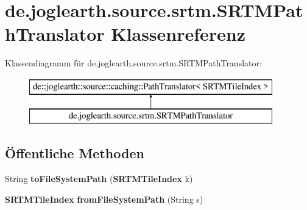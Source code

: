 \section{de.\-joglearth.\-source.\-srtm.\-S\-R\-T\-M\-Path\-Translator Klassenreferenz}
\label{classde_1_1joglearth_1_1source_1_1srtm_1_1_s_r_t_m_path_translator}
Klassendiagramm für de.\-joglearth.\-source.\-srtm.\-S\-R\-T\-M\-Path\-Translator\-:\begin{figure}[H]
\begin{center}
\leavevmode
\includegraphics[height=2.000000cm]{classde_1_1joglearth_1_1source_1_1srtm_1_1_s_r_t_m_path_translator}
\end{center}
\end{figure}
\subsection*{Öffentliche Methoden}
\begin{DoxyCompactItemize}
\item 
String {\bfseries to\-File\-System\-Path} ({\bf S\-R\-T\-M\-Tile\-Index} k)\label{classde_1_1joglearth_1_1source_1_1srtm_1_1_s_r_t_m_path_translator_a76ef87db7c98e35b4cf18c3a717f8312}

\item 
{\bf S\-R\-T\-M\-Tile\-Index} {\bfseries from\-File\-System\-Path} (String s)\label{classde_1_1joglearth_1_1source_1_1srtm_1_1_s_r_t_m_path_translator_a1d8d95cecaab190368a542b713fe671b}

\end{DoxyCompactItemize}
